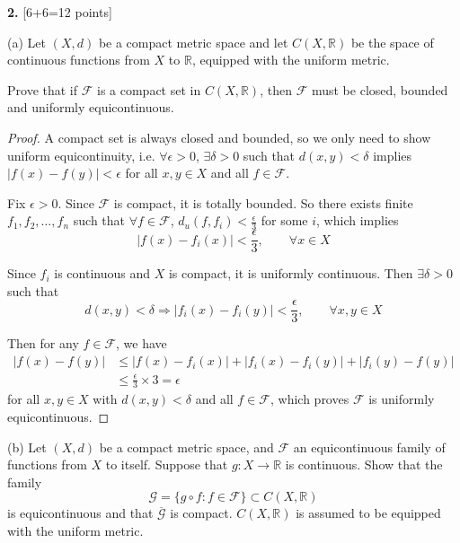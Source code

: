 \documentclass[11pt,a4paper]{amsart}
\def\R{{\mathbb R}}
\def\d{\delta}
\def\e{\epsilon}
\def\ra{\rightarrow}
\begin{document}
\bigskip


{\bf 2.} [6+6=12 points] 

(a) Let $(X,d)$ be a compact metric space and let $C(X,\R)$ be the space of continuous functions 
from $X$ to $\R$, equipped with the uniform metric.

Prove that if $\mathcal{F}$ is a compact set in $C(X,\R)$, then $\mathcal{F}$
must be closed, bounded and uniformly equicontinuous.

\begin{proof}
A compact set is always closed and bounded, so we only need to show uniform equicontinuity, i.e. $\forall\e>0$, $\exists\d>0$ such that $d(x,y)<\d$ implies 
$|f(x) - f(y)| < \e$ for all $x,y \in X$ and all $f\in \mathcal{F}$.

Fix $\e>0$. Since $\mathcal{F}$ is compact, it is totally bounded. 
So there exists finite $f_1, f_2, \dots, f_n$ such that $\forall f \in \mathcal{F}$, 
$d_u(f, f_i) < \frac{\e}{3}$ for some $i$, which implies 
$$ |f(x) - f_i(x)| < \frac{\e}{3}, \qquad\forall x\in X $$

Since $f_i$ is continuous and $X$ is compact, it is uniformly continuous.
Then $\exists\d>0$ such that
$$d(x,y)<\d \Rightarrow |f_i(x) - f_i(y)| < \frac{\e}{3}, \qquad\forall x,y\in X $$

Then for any $f \in\mathcal{F}$, we have
\begin{align*}
|f(x) - f(y)| 
&\le |f(x) - f_i(x)| + |f_i(x) - f_i(y)| + |f_i(y) - f(y)| \\
&\le \frac{\e}{3}\times 3 = \e     
\end{align*}
for all $x,y\in X$ with $d(x,y)<\d$ and all $f\in\mathcal{F}$,
which proves $\mathcal{F}$ is uniformly equicontinuous.
\end{proof}


\medskip

(b) Let $(X,d)$ be a compact metric space, and $\mathcal{F}$ an equicontinuous family
of functions from $X$ to itself. Suppose that $g:X\ra \mathbb{R}$ is continuous. 
Show that the family 
$$\mathcal{G}=\{ g\circ f:f\in\mathcal{F} \} \subset C(X,\mathbb{R}) $$
is equicontinuous and that $\overline{\mathcal{G}}$ is compact.  $C(X,\R)$ is assumed to be 
equipped with the uniform metric.
\end{document}
